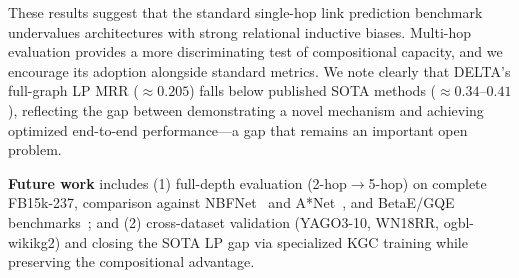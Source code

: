 \documentclass{article}
\begin{document}
These results suggest that the standard single-hop link prediction benchmark undervalues architectures with strong relational inductive biases. Multi-hop evaluation provides a more discriminating test of compositional capacity, and we encourage its adoption alongside standard metrics. We note clearly that DELTA's full-graph LP MRR ($\approx 0.205$) falls below published SOTA methods ($\approx 0.34$--$0.41$), reflecting the gap between demonstrating a novel mechanism and achieving optimized end-to-end performance---a gap that remains an important open problem.

\textbf{Future work} includes (1) full-depth evaluation (2-hop$\to$5-hop) on complete FB15k-237, comparison against NBFNet~\cite{zhu2021neural} and A*Net~\cite{zhu2022astar}, and BetaE/GQE benchmarks~\cite{ren2020beta}; and (2) cross-dataset validation (YAGO3-10, WN18RR, ogbl-wikikg2) and closing the SOTA LP gap via specialized KGC training while preserving the compositional advantage.



\end{document}
